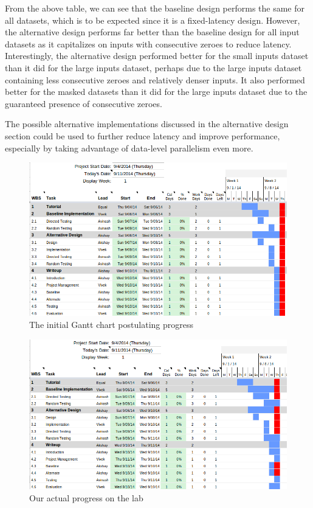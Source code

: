 \documentclass[11pt]{article}
\begin{document}
From the above table, we can see that the baseline design performs the same for all datasets, which is to be expected since it is a fixed-latency design. However, the alternative design performs far better than the baseline design for all input datasets as it capitalizes on inputs with consecutive zeroes to reduce latency. Interestingly, the alternative design performed better for the small inputs dataset than it did for the large inputs dataset, perhaps due to the large inputs dataset containing less consecutive zeroes and relatively denser inputs. It also performed better for the masked datasets than it did for the large inputs dataset due to the guaranteed presence of consecutive zeroes.

The possible alternative implementations discussed in the alternative design section could be used to further reduce latency and improve performance, especially by taking advantage of data-level parallelism even more.


\begin{figure}[b]
\centering
\includegraphics[scale=0.5]{gantt}
\caption{The initial Gantt chart postulating progress}
\label{fig:gantt}
\end{figure}

\begin{figure}[b]
\centering
\includegraphics[scale=0.5]{gantt_actual}
\caption{Our actual progress on the lab}
\label{fig:gantt_actual}
\end{figure}
\end{document}
